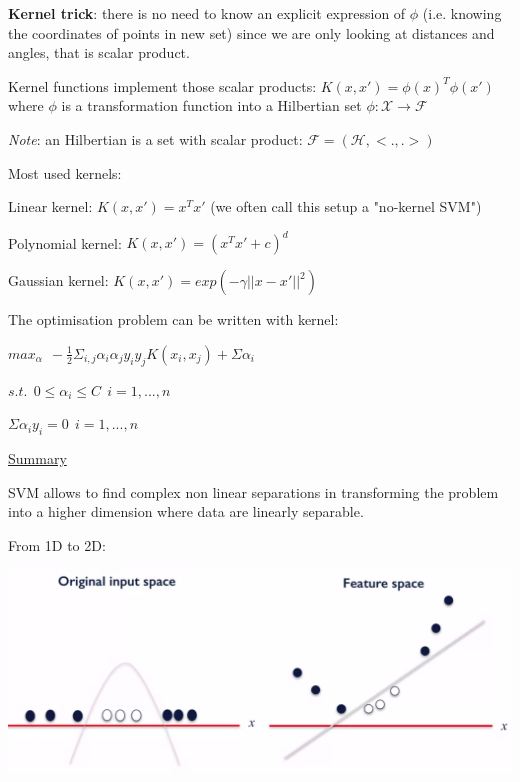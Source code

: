 \textbf{Kernel trick}: there is no need to know an explicit expression of $\phi$ (i.e. knowing the coordinates of points in new set) since we are only looking at distances and angles, that is scalar product.

\vspace{5mm}

Kernel functions implement those scalar products: $K(x,x')=\phi(x)^T \phi(x')$ where $\phi$ is a transformation function into a Hilbertian set $\phi : \mathcal{X} \to \mathcal{F} $

\textit{Note}: an Hilbertian is a set with scalar product: $\mathcal{F}=(\mathcal{H},<.,.>)$

\vspace{5mm}

Most used kernels:

Linear kernel: $K(x,x') = x^Tx'$ (we often call this setup a "no-kernel SVM")

Polynomial kernel: $K(x,x') = (x^Tx'+c)^d$

Gaussian kernel: $K(x,x') = exp(-\gamma||x-x'||^2)$

\vspace{5mm}

The optimisation problem can be written with kernel:

\begin{center}

$max_\alpha~~-\frac{1}{2}\Sigma_{i,j} \alpha_i \alpha_j y_i y_j K(x_i,x_j) + \Sigma \alpha_i$

$s.t.~~0 \leq \alpha_i \leq C~~i=1,...,n$

$\Sigma \alpha_i y_i = 0~~i=1,...,n$

\end{center}

\vspace{5mm}

\underline{Summary}

\vspace{5mm}

SVM allows to find complex non linear separations in transforming the problem into a higher dimension where data are linearly separable.

\vspace{5mm}

From 1D to 2D:

\begin{center}
\includegraphics[scale=0.15]{kernel_2D.png}
\end{center}

